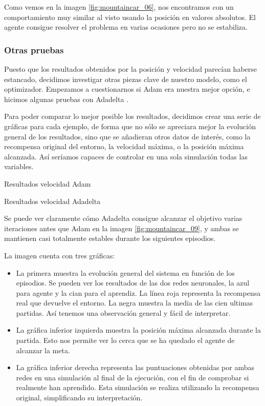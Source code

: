 Como vemos en la imagen \ref{fig:mountaincar_06}, nos encontramos con un comportamiento muy similar al visto usando la posición en valores absolutos. El agente consigue resolver el problema en varias ocasiones pero no se estabiliza.



\subsubsection*{Otras pruebas}

Puesto que los resultados obtenidos por la posición y velocidad parecían haberse estancado, decidimos investigar otras piezas clave de nuestro modelo, como el optimizador. Empezamos a cuestionarnos si Adam \citep{kingma2014adam} era nuestra mejor opción, e hicimos algunas pruebas con Adadelta \citep{NIPS2017_7003}.

Para poder comparar lo mejor posible los resultados, decidimos crear una serie de gráficas para cada ejemplo, de forma que no sólo se apreciara mejor la evolución general de los resultados, sino que se añadieran otros datos de interés, como la recompensa original del entorno, la velocidad máxima, o la posición máxima alcanzada. Así seríamos capaces de controlar en una sola simulación todas las variables.

%
       {Resultados velocidad Adam}

%
       {Resultados velocidad Adadelta}

Se puede ver claramente cómo Adadelta consigue alcanzar el objetivo varias iteraciones antes que Adam en la imagen \ref{fig:mountaincar_09}, y ambas se mantienen casi totalmente estables durante los siguientes episodios.

       
La imagen cuenta con tres gráficas:
\begin{itemize}
    \item La primera muestra la evolución general del sistema en función de los episodios. Se pueden ver los resultados de las dos redes neuronales, la azul para agente y la cian para el aprendiz. La línea roja representa la recompensa real que devuelve el entorno. La negra muestra la media de las cien ultimas partidas. Así tenemos una observación general y fácil de interpretar.
    \item La gráfica inferior izquierda muestra la posición máxima alcanzada durante la partida. Esto nos permite ver lo cerca que se ha quedado el agente de alcanzar la meta.
    \item La gráfica inferior derecha representa las puntuaciones obtenidas por ambas redes en una simulación al final de la ejecución, con el fin de comprobar si realmente han aprendido. Esta simulación se realiza utilizando la recompensa original, simplificando su interpretación.  
\end{itemize}

